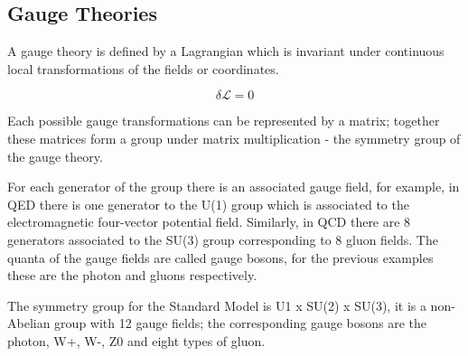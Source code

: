 \subsection{Gauge Theories}
\label{section: gauge theories}

A gauge theory is defined by a Lagrangian which is invariant under continuous local transformations of the fields or coordinates. 

\begin{equation}
	\delta \mathcal{L} = 0
\end{equation}

Each possible gauge transformations can be represented by a matrix; together these matrices form a group under matrix multiplication - the symmetry group of the gauge theory.

For each generator of the group there is an associated gauge field, for example, in QED there is one generator to the U(1) group which is associated to the electromagnetic four-vector potential field. Similarly, in QCD there are 8 generators associated to the SU(3) group corresponding to 8 gluon fields. The quanta of the gauge fields are called gauge bosons, for the previous examples these are the photon and gluons respectively.

The symmetry group for the Standard Model is U1 x SU(2) x SU(3), it is a non-Abelian group with 12 gauge fields; the corresponding gauge bosons are the photon, W+, W-, Z0 and eight types of gluon.

%